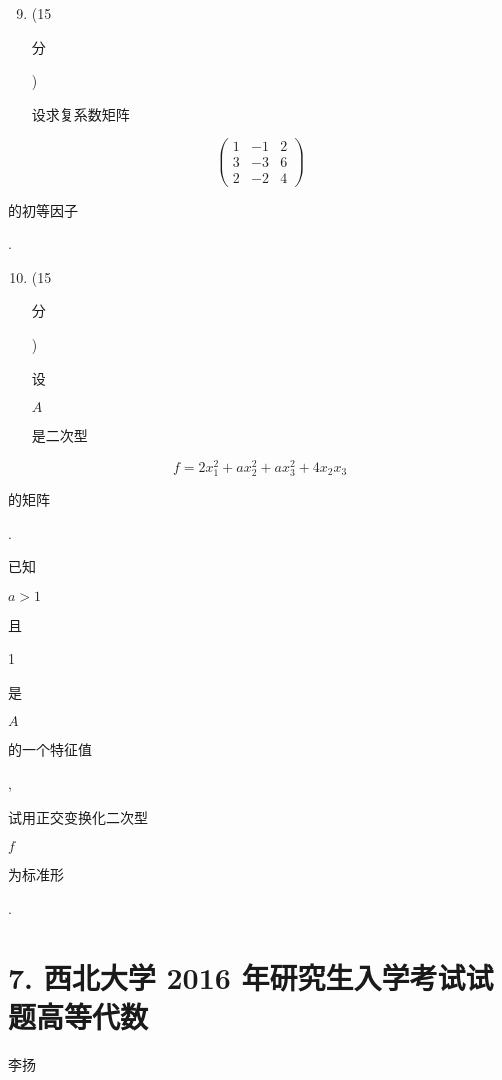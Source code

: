 \documentclass[10pt]{article}
\begin{document}
\begin{enumerate}
  \setcounter{enumi}{8}
  \item (15 \begin{CJK}{UTF8}{mj}分\end{CJK}) \begin{CJK}{UTF8}{mj}设求复系数矩阵\end{CJK}
\end{enumerate}
$$
\left(\begin{array}{rrr}
1 & -1 & 2 \\
3 & -3 & 6 \\
2 & -2 & 4
\end{array}\right)
$$
\begin{CJK}{UTF8}{mj}的初等因子\end{CJK}.

\begin{enumerate}
  \setcounter{enumi}{9}
  \item (15 \begin{CJK}{UTF8}{mj}分\end{CJK}) \begin{CJK}{UTF8}{mj}设\end{CJK} $A$ \begin{CJK}{UTF8}{mj}是二次型\end{CJK}
\end{enumerate}
$$
f=2 x_{1}^{2}+a x_{2}^{2}+a x_{3}^{2}+4 x_{2} x_{3}
$$
\begin{CJK}{UTF8}{mj}的矩阵\end{CJK}. \begin{CJK}{UTF8}{mj}已知\end{CJK} $a>1$ \begin{CJK}{UTF8}{mj}且\end{CJK} 1 \begin{CJK}{UTF8}{mj}是\end{CJK} $A$ \begin{CJK}{UTF8}{mj}的一个特征值\end{CJK}, \begin{CJK}{UTF8}{mj}试用正交变换化二次型\end{CJK} $f$ \begin{CJK}{UTF8}{mj}为标准形\end{CJK}.

\section{7. 西北大学 2016 年研究生入学考试试题高等代数}
\begin{CJK}{UTF8}{mj}李扬\end{CJK}
\end{document}
